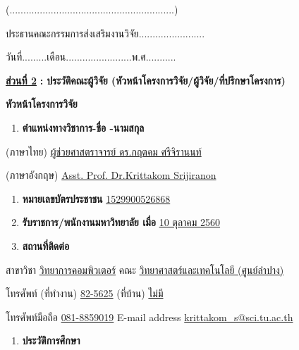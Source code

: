 \documentclass[16pt]{extarticle}
\begin{document}
(............................................................)

ประธานคณะกรรมการส่งเสริมงานวิจัย........................

วันที่.........เดือน........................พ.ศ...........

\uline{\hfill\break
\textbf{ส่วนที่ 2}} \textbf{: ประวัติคณะผู้วิจัย
(หัวหน้าโครงการวิจัย/ผู้วิจัย/ที่ปรึกษาโครงการ)}

\textbf{หัวหน้าโครงการวิจัย}

\begin{enumerate}
\def\labelenumi{\arabic{enumi}.}
\item
  \textbf{ตำแหน่งทางวิชาการ-ชื่อ -นามสกุล}
\end{enumerate}

\noindent\hspace{1em}(ภาษาไทย) \uline{ผู้ช่วยศาสตราจารย์ ดร.กฤตคม ศรีจิรานนท์}

\noindent\hspace{1em}(ภาษาอังกฤษ) \uline{Asst. Prof. Dr.Krittakom Srijiranon}

\begin{enumerate}
\def\labelenumi{\arabic{enumi}.}
\setcounter{enumi}{1}
\item
  \textbf{หมายเลขบัตรประชาชน} \uline{1529900526868}
\item
  \textbf{รับราชการ/พนักงานมหาวิทยาลัย เมื่อ} \uline{10 ตุลาคม 2560}
\item
  \textbf{สถานที่ติดต่อ}
\end{enumerate}

สาขาวิชา \uline{วิทยาการคอมพิวเตอร์} คณะ \uline{วิทยาศาสตร์และเทคโนโลยี (ศูนย์ลำปาง)}

โทรศัพท์ (ที่ทำงาน) \uline{82-5625} (ที่บ้าน) \uline{ไม่มี}

โทรศัพท์มือถือ \uline{081-8859019} E-mail address
\uline{krittakom\_s@sci.tu.ac.th}

\begin{enumerate}
\def\labelenumi{\arabic{enumi}.}
\setcounter{enumi}{4}
\item
  \textbf{ประวัติการศึกษา}
\end{enumerate}
\end{document}
